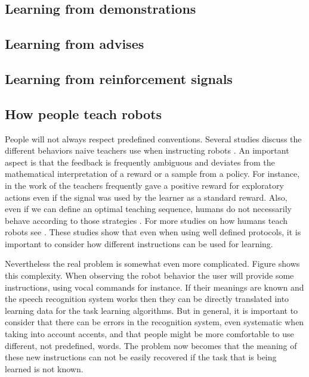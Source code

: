 \subsection{Learning from demonstrations}

\subsection{Learning from advises}

\subsection{Learning from reinforcement signals}

\subsection{How people teach robots}

People will not always respect predefined conventions. Several studies discuss the different behaviors naive teachers use when instructing robots \cite{thomaz2008teachable,Cakmak2010optimality}. An important aspect is that the feedback is frequently ambiguous and deviates from the mathematical interpretation of a reward or a sample from a policy. For instance, in the work of \cite{thomaz2008teachable} the teachers frequently gave a positive reward for exploratory actions even if the signal was used by the learner as a standard reward. Also, even if we can define an optimal teaching sequence, humans do not necessarily behave according to those strategies \cite{Cakmak2010optimality}. For more studies on how humans teach robots see \cite{thomaz2009learning,kaochar2011towards,knox2012humans}. These studies show that even when using well defined protocols, it is important to consider how different instructions can be used for learning. 

Nevertheless the real problem is somewhat even more complicated. Figure shows this complexity. When observing the robot behavior the user will provide some instructions, using vocal commands for instance. If their meanings are known and the speech recognition system works then they can be directly translated into learning data for the task learning algorithms. But in general, it is important to consider that there can be errors in the recognition system, even systematic when taking into account accents, and that people might be more comfortable to use different, not predefined, words. The problem now becomes that the meaning of these new instructions can not be easily recovered if the task that is being learned is not known.

